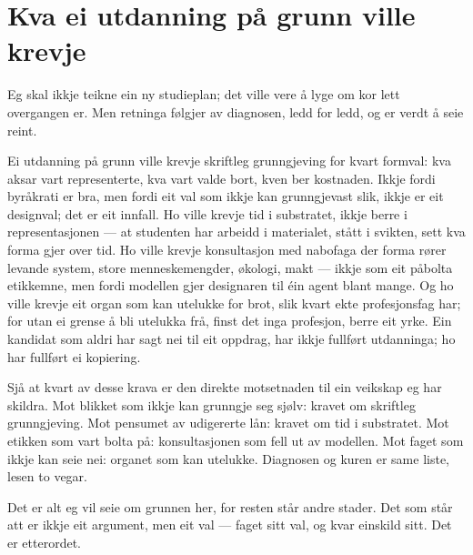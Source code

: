 \section{Kva ei utdanning på grunn ville krevje}

Eg skal ikkje teikne ein ny studieplan; det ville vere å lyge om kor lett overgangen er. Men retninga følgjer av diagnosen, ledd for ledd, og er verdt å seie reint.

Ei utdanning på grunn ville krevje skriftleg grunngjeving for kvart formval: kva aksar vart representerte, kva vart valde bort, kven ber kostnaden. Ikkje fordi byråkrati er bra, men fordi eit val som ikkje kan grunngjevast slik, ikkje er eit designval; det er eit innfall. Ho ville krevje tid i substratet, ikkje berre i representasjonen — at studenten har arbeidd i materialet, stått i svikten, sett kva forma gjer over tid. Ho ville krevje konsultasjon med nabofaga der forma rører levande system, store menneskemengder, økologi, makt — ikkje som eit påbolta etikkemne, men fordi modellen gjer designaren til éin agent blant mange. Og ho ville krevje eit organ som kan utelukke for brot, slik kvart ekte profesjonsfag har; for utan ei grense å bli utelukka frå, finst det inga profesjon, berre eit yrke. Ein kandidat som aldri har sagt nei til eit oppdrag, har ikkje fullført utdanninga; ho har fullført ei kopiering.

Sjå at kvart av desse krava er den direkte motsetnaden til ein veikskap eg har skildra. Mot blikket som ikkje kan grunngje seg sjølv: kravet om skriftleg grunngjeving. Mot pensumet av udigererte lån: kravet om tid i substratet. Mot etikken som vart bolta på: konsultasjonen som fell ut av modellen. Mot faget som ikkje kan seie nei: organet som kan utelukke. Diagnosen og kuren er same liste, lesen to vegar.

\vignett

Det er alt eg vil seie om grunnen her, for resten står andre stader. Det som står att er ikkje eit argument, men eit val — faget sitt val, og kvar einskild sitt. Det er etterordet.
